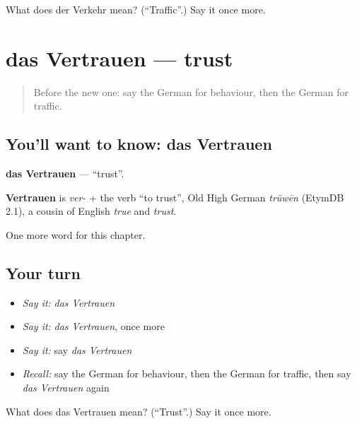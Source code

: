 \begin{tcolorbox}[breakable,colback=teal!4,colframe=teal!35!black,title={Before you move on}]
What does der Verkehr mean? (\textquotedblleft{}Traffic\textquotedblright{}.) Say it once more.
\end{tcolorbox}
\section[das Vertrauen]{das Vertrauen — trust}

\label{lesson:GE-C242-vertrauen}



\begin{quote}
Before the new one: say the German for behaviour, then the German for traffic.
\end{quote}

\subsection*{You'll want to know: das Vertrauen}
\textbf{das Vertrauen} — \textquotedblleft{}trust\textquotedblright{}.

\begin{cousinweb}
\textbf{Vertrauen} is \emph{ver-} + the verb \textquotedblleft{}to trust\textquotedblright{}, Old High German \emph{trūwēn} (EtymDB 2.1), a cousin of English \emph{true} and \emph{trust}.
\end{cousinweb}

\begin{grammarlens}[title={What you've built}]
One more word for this chapter.
\end{grammarlens}

\subsection*{Your turn}
\begin{itemize}
\raggedright
  \item \emph{Say it:} \emph{das Vertrauen}
  \item \emph{Say it:} \emph{das Vertrauen}, once more
  \item \emph{Say it:} say \emph{das Vertrauen}
  \item \emph{Recall:} say the German for behaviour, then the German for traffic, then say \emph{das Vertrauen} again
\end{itemize}

\begin{tcolorbox}[breakable,colback=teal!4,colframe=teal!35!black,title={Before you move on}]
What does das Vertrauen mean? (\textquotedblleft{}Trust\textquotedblright{}.) Say it once more.
\end{tcolorbox}
